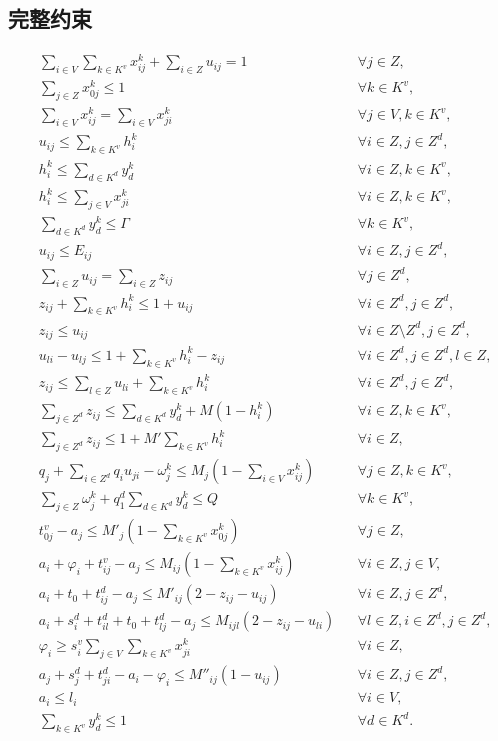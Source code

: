 \documentclass[UTF8]{ctexart}
\begin{document}
\subsection*{完整约束}
\[
\begin{aligned}
&\sum_{i \in V} \sum_{k \in K^v} x^k_{ij} + \sum_{i \in Z} u_{ij} = 1 && \forall j \in Z, \\
&\sum_{j \in Z} x^k_{0j} \le 1 && \forall k \in K^v, \\
&\sum_{i \in V} x^k_{ij} = \sum_{i \in V} x^k_{ji} && \forall j \in V, k \in K^v, \\
&u_{ij} \le \sum_{k \in K^v} h^k_i && \forall i \in Z, j \in Z^d, \\
&h^k_i \le \sum_{d \in K^d} y^k_d && \forall i \in Z, k \in K^v, \\
&h^k_i \le \sum_{j \in V} x^k_{ji} && \forall i \in Z, k \in K^v, \\
&\sum_{d \in K^d} y^k_d \le \Gamma && \forall k \in K^v, \\
&u_{ij} \le E_{ij} && \forall i \in Z, j \in Z^d, \\
&\sum_{i \in Z} u_{ij} = \sum_{i \in Z} z_{ij} && \forall j \in Z^d, \\
&z_{ij} + \sum_{k \in K^v} h^k_i \le 1 + u_{ij} && \forall i \in Z^d, j \in Z^d, \\
&z_{ij} \le u_{ij} && \forall i \in Z \setminus Z^d, j \in Z^d, \\
&u_{li} - u_{lj} \le 1 + \sum_{k \in K^v} h^k_i - z_{ij} && \forall i \in Z^d, j \in Z^d, l \in Z, \\
&z_{ij} \le \sum_{l \in Z} u_{li} + \sum_{k \in K^v} h^k_i && \forall i \in Z^d, j \in Z^d, \\
&\sum_{j \in Z^d} z_{ij} \le \sum_{d \in K^d} y^k_d + M(1 - h^k_i) && \forall i \in Z, k \in K^v, \\
&\sum_{j \in Z^d} z_{ij} \le 1 + M' \sum_{k \in K^v} h^k_i && \forall i \in Z, \\
&q_j + \sum_{i \in Z^d} q_i u_{ji} - \omega^k_j \le M_j(1 - \sum_{i \in V} x^k_{ij}) && \forall j \in Z, k \in K^v, \\
&\sum_{j \in Z} \omega^k_j + q^d_1 \sum_{d \in K^d} y^k_d \le Q && \forall k \in K^v, \\
&t^v_{0j} - a_j \le M'_j(1 - \sum_{k \in K^v} x^k_{0j}) && \forall j \in Z, \\
&a_i + \varphi_i + t^v_{ij} - a_j \le M_{ij}(1 - \sum_{k \in K^v} x^k_{ij}) && \forall i \in Z, j \in V, \\
&a_i + t_0 + t^d_{ij} - a_j \le M'_{ij}(2 - z_{ij} - u_{ij}) && \forall i \in Z, j \in Z^d, \\
&a_i + s^d_i + t^d_{il} + t_0 + t^d_{lj} - a_j \le M_{ijl}(2 - z_{ij} - u_{li}) && \forall l \in Z, i \in Z^d, j \in Z^d, \\
&\varphi_i \ge s^v_i \sum_{j \in V} \sum_{k \in K^v} x^k_{ji} && \forall i \in Z, \\
&a_j + s^d_j + t^d_{ji} - a_i - \varphi_i \le M''_{ij}(1 - u_{ij}) && \forall i \in Z, j \in Z^d, \\
&a_i \le l_i && \forall i \in V, \\
&\sum_{k\in K^v}y_d^k\le 1 && \forall d\in K^d.
\end{aligned}
\]
\end{document}
